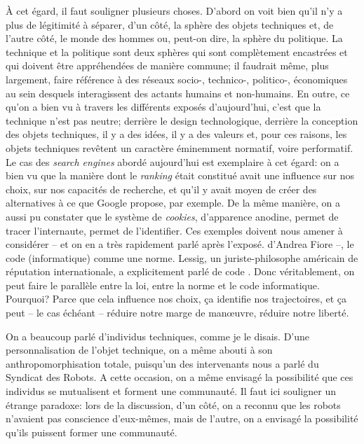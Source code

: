 {\`A cet \'egard, il faut souligner plusieurs choses. D'abord on voit bien qu'il n'y a plus de l\'egitimit\'e \`a s\'eparer, d'un c\^ot\'e, la sph\`ere des objets techniques et, de l'autre c\^ot\'e, le monde des hommes ou, peut{}-on dire, la sph\`ere du politique. La technique et la politique sont deux sph\`eres qui sont compl\`etement encastr\'ees et qui doivent \^etre appr\'ehend\'ees de mani\`ere commune; il faudrait m\^eme, plus largement, faire r\'ef\'erence \`a des r\'eseaux socio{}-, technico{}-, politico{}-, \'economiques au sein desquels interagissent des actants humains et non{}-humains. En outre, ce qu'on a bien vu \`a travers les diff\'erents expos\'es d'aujourd'hui, c'est que la technique n'est pas neutre; derri\`ere le design technologique, derri\`ere la conception des objets techniques, il y a des id\'ees, il y a des valeurs et, pour ces raisons, les objets techniques rev\^etent un caract\`ere \'eminemment normatif, voire performatif. Le cas des {\em search engines} abord\'e aujourd'hui est exemplaire \`a cet \'egard: on a bien vu que la mani\`ere dont le {\em ranking} \'etait constitu\'e avait une influence sur nos choix, sur nos capacit\'es de recherche, et qu'il y avait moyen de cr\'eer des alternatives \`a ce que Google propose, par exemple. De la m\^eme mani\`ere, on a aussi pu constater que le syst\`eme de {\em cookies}, d'apparence anodine, permet de tracer l'internaute, permet de l'identifier. Ces exemples doivent nous amener \`a consid\'erer {--} et on en a tr\`es rapidement parl\'e apr\`es l'expos\'e. d'Andrea Fiore {--}, le code (informatique) comme une norme. Lessig, un juriste{}-philosophe am\'ericain de r\'eputation internationale, a explicitement parl\'e de code {\em {}}. Donc v\'eritablement, on peut faire le parall\`ele entre la loi, entre la norme et le code informatique. Pourquoi? Parce que cela influence nos choix, \c{c}a identifie nos trajectoires, et \c{c}a peut {--} le cas \'ech\'eant {--} r\'eduire notre marge de man{\oe}uvre, r\'eduire notre libert\'e.

On a beaucoup parl\'e d'individus techniques, comme je le disais. D'une personnalisation de l'objet technique, on a m\^eme abouti \`a son anthropomorphisation totale, puisqu'un des intervenants nous a parl\'e du Syndicat des Robots. A cette occasion, on a m\^eme envisag\'e la possibilit\'e que ces individus se mutualisent et forment une communaut\'e. Il faut ici souligner un \'etrange paradoxe: lors de la discussion, d'un c\^ot\'e, on a reconnu que les robots n'avaient pas conscience d'eux{}-m\^emes, mais de l'autre, on a envisag\'e la possibilit\'e qu'ils puissent former une communaut\'e.

}
